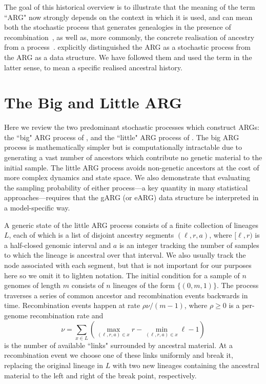 \documentclass{article}
\begin{document}
The goal of this historical overview is to illustrate that the meaning of the term ``ARG" now strongly
depends on the context in which it is used, and can mean both the
stochastic process that generates genealogies in the presence of
recombination~\citep[e.g.][]{nordborg2000linkage,birkner2013ancestral,
wilton2015smc,griffiths2016coalescent},
as well as, more commonly, the concrete realisation of ancestry from a
process~\citep[e.g.][]{gusfield2014recombinatorics,mathieson2020ancestry,brandt2021evaluation}.
\cite{minichiello2006mapping} explicitly distinguished the ARG as a
stochastic process from the ARG as a data structure. We have followed them and
used the term in the latter sense, to mean a specific realised ancestral history.

\section{The Big and Little ARG}
\label{sec-big-and-little-arg}
Here we review the two predominant stochastic processes which construct ARGs:
the ``big" ARG process of \cite{griffiths1997ancestral}, and the ``little" ARG process of
 \cite{hudson1983properties}. The big ARG process is mathematically simpler
 but is computationally intractable due to generating a vast number of ancestors
 which contribute no genetic material to the initial sample.
The little ARG process avoids non-genetic ancestors at the cost of more complex
dynamics and state space. We also demonstrate that evaluating the sampling probability
of either process---a key quantity in many statistical approaches---requires that the
gARG (or eARG) data structure be interpreted in a model-specific way.

A generic state of the little ARG process consists of a finite collection of lineages $L$,
each of which is a list of disjoint ancestry segments $(\ell, r, a)$, where
$[\ell, r)$ is a half-closed genomic interval and $a$ is an integer
tracking the number of samples to which the lineage is ancestral over that interval.
We also usually track the node associated with each segment, but
that is not important for our purposes here so we omit it to lighten notation.
The initial condition for a sample of $n$ genomes of length $m$ consists of $n$ lineages
of the form $\{(0, m, 1)\}$. The process traverses a series of common ancestor and
recombination events backwards in time.
Recombination events happen at rate $\rho \nu / (m - 1)$,
where $\rho \geq 0$ is a per-genome recombination rate and
 \[
 \nu = \sum_{x \in L}\left( \max_{(\ell, r, a) \in x}r
     - \min_{(\ell, r, a) \in x}\ell - 1 \right)
 \]
 is the number of available ``links" surrounded by ancestral material.
 At a recombination event we choose one of these links uniformly and break it,
 replacing the original lineage in $L$ with two new lineages containing the ancestral material
 to the left and right of the break point, respectively.
\end{document}
